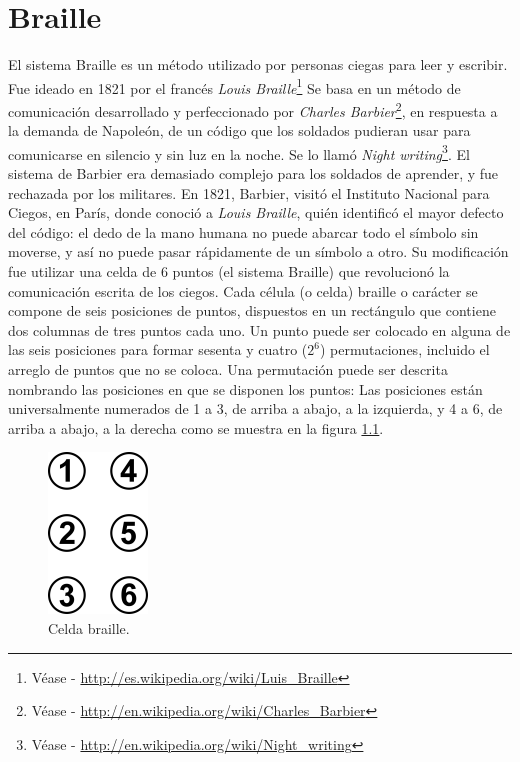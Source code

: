 \chapter{Braille}
%
El sistema Braille es un m\'etodo utilizado por personas ciegas para leer y 
escribir. Fue ideado en 1821 por el franc\'es \emph{Louis
Braille}\footnote{V\'ease - \url{http://es.wikipedia.org/wiki/Luis_Braille}}
Se basa en un m\'etodo de comunicaci\'on desarrollado y perfeccionado por 
\emph{Charles Barbier}\footnote{V\'ease -
\url{http://en.wikipedia.org/wiki/Charles_Barbier}}, en respuesta a la demanda
de Napole\'on, de un c\'odigo que los soldados pudieran usar para comunicarse
en silencio y sin luz en la noche.
Se lo llam\'o \emph{Night writing}\footnote{V\'ease -
\url{http://en.wikipedia.org/wiki/Night_writing}}. El sistema de Barbier era
demasiado complejo para los soldados de aprender, y fue rechazada por los
militares. 
En 1821, Barbier, visit\'o el Instituto Nacional para Ciegos, en Par\'is, donde
conoci\'o a \emph{Louis Braille}, qui\'en identific\'o el mayor defecto del
c\'odigo: el dedo de la mano humana no puede abarcar todo el s\'imbolo sin
moverse, y as\'i no puede pasar r\'apidamente de un s\'imbolo a otro.
Su modificaci\'on fue utilizar una celda de 6 puntos (el sistema Braille) que 
revolucion\'o la comunicaci\'on escrita de los ciegos.
Cada c\'elula (o celda) braille o car\'acter se compone de seis posiciones de 
puntos, dispuestos en un rect\'angulo que contiene dos columnas de tres puntos
cada uno. Un punto puede ser colocado en alguna de las seis posiciones para
formar sesenta y cuatro ($2^{6}$) permutaciones, incluido el arreglo de puntos
que no se coloca. Una permutaci\'on puede ser descrita nombrando las posiciones
en que se disponen los puntos: Las posiciones est\'an universalmente numerados
de 1 a 3, de arriba a abajo, a la izquierda, y 4 a 6, de arriba a abajo, a la
derecha como se muestra en la figura \ref{fig:braille_cell}.

\clearpage
\begin{figure}[htp]
\centering
\includegraphics[scale=0.6]{./img/braille_cell.png}
\caption{Celda braille.}
\label{fig:braille_cell}
\end{figure}


